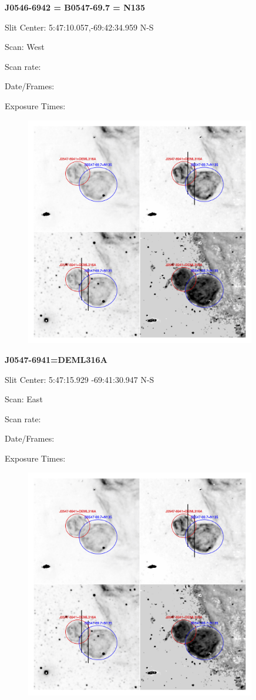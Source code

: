 \documentclass[11pt]{article}
\begin{document}
\newpage 
 
{\bf J0546-6942 = B0547-69.7 = N135}

Slit Center:  5:47:10.057,-69:42:34.959  N-S

Scan:  West

Scan rate:  

Date/Frames:

Exposure Times:  

\begin{figure}
\includegraphics[width=10.05cm]{snapshots/B0547-697_double.png}
\end{figure}

\newpage 
 
{\bf J0547-6941=DEML316A}

Slit Center:  5:47:15.929   -69:41:30.947  N-S

Scan:  East

Scan rate:  

Date/Frames:

Exposure Times:  

\begin{figure}
\includegraphics[width=10.05cm]{snapshots/B0547-697_double.png}
\end{figure}
\end{document}
